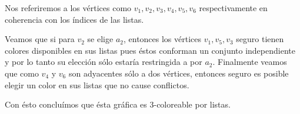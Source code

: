 \documentclass{article}
\begin{document}
\begin{enumerate}
   Nos referiremos a los vértices como $v_1,v_2,v_3,v_4,v_5,v_6$ respectivamente en coherencia con los índices de las listas.

   Veamos que si para $v_2$ se elige $a_2$, entonces los vértices $v_1,v_5,v_3$ seguro tienen colores disponibles en sus listas pues éstos conforman un conjunto independiente y por lo tanto su elección sólo estaría restringida a por $a_2$. Finalmente veamos que como $v_4$ y $v_6$ son adyacentes sólo a dos vértices, entonces seguro es posible elegir un color en sus listas que no cause conflictos.

   Con ésto concluímos que ésta gráfica es $3$-coloreable por listas.

\end{enumerate}
\end{document}
